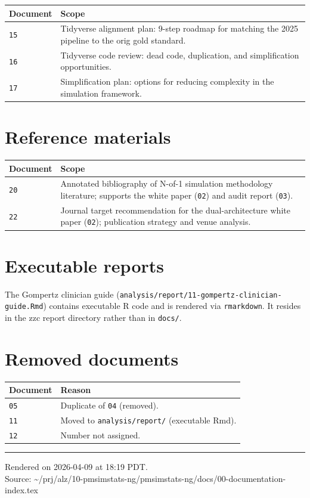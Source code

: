 \documentclass[11pt]{article}
\begin{document}
\begin{center}
\begin{tabular}{lp{9cm}}
\toprule
\textbf{Document} & \textbf{Scope} \\
\midrule
\texttt{15} & Tidyverse alignment plan: 9-step roadmap for
  matching the 2025 pipeline to the orig gold standard. \\
\texttt{16} & Tidyverse code review: dead code, duplication,
  and simplification opportunities. \\
\texttt{17} & Simplification plan: options for reducing
  complexity in the simulation framework. \\
\bottomrule
\end{tabular}
\end{center}

\section{Reference materials}

\begin{center}
\begin{tabular}{lp{9cm}}
\toprule
\textbf{Document} & \textbf{Scope} \\
\midrule
\texttt{20} & Annotated bibliography of N-of-1 simulation
  methodology literature; supports the white paper
  (\texttt{02}) and audit report (\texttt{03}). \\
\texttt{22} & Journal target recommendation for the
  dual-architecture white paper (\texttt{02}); publication
  strategy and venue analysis. \\
\bottomrule
\end{tabular}
\end{center}

\section{Executable reports}

The Gompertz clinician guide
(\texttt{analysis/report/11-gompertz-clinician-guide.Rmd})
contains executable R code and is rendered via
\texttt{rmarkdown}. It resides in the zzc report directory
rather than in \texttt{docs/}.

\section{Removed documents}

\begin{center}
\begin{tabular}{lp{9cm}}
\toprule
\textbf{Document} & \textbf{Reason} \\
\midrule
\texttt{05} & Duplicate of \texttt{04} (removed). \\
\texttt{11} & Moved to \texttt{analysis/report/} (executable
  Rmd). \\
\texttt{12} & Number not assigned. \\
\bottomrule
\end{tabular}
\end{center}

\vfill
\noindent\rule{\textwidth}{0.4pt}
{\footnotesize
Rendered on 2026-04-09 at 18:19 PDT.\\
Source: \textasciitilde/prj/alz/10-pmsimstats-ng/pmsimstats-ng/docs/00-documentation-index.tex}
\end{document}
